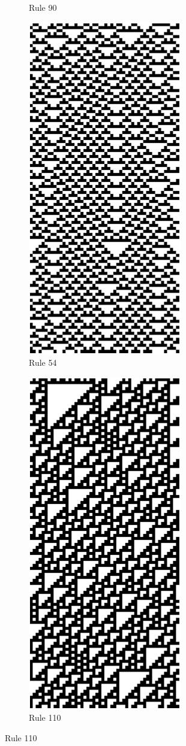 \begin{figure}
\begin{subfigure}[b]{0.275\textwidth}
   		\caption[]{Rule 90}%
   	\end{subfigure}%
   		\begin{subfigure}[b]{0.25\textwidth}
   			\centering
   			\includegraphics[scale=0.32]{./images/CA_FDM/rule54}
   			\caption[]{Rule 54}%
   		\end{subfigure}%
   		\begin{subfigure}[b]{0.25\textwidth}
   			\centering
   			\includegraphics[scale=0.32]{./images/CA_FDM/rule110}
   			\caption[]{Rule 110}%
   		\end{subfigure}%
   	
   	
\end{figure}
